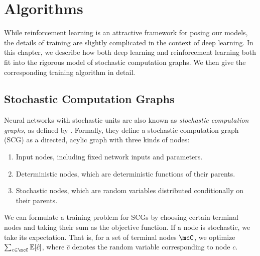 \documentclass[12pt]{report}
\begin{document}


\chapter{Algorithms}
\label{chap:algorithms}

While reinforcement learning is an attractive framework for posing our models, the details of training are slightly complicated in the context of deep learning.
In this chapter, we describe how both deep learning and reinforcement learning both fit into the rigorous model of stochastic computation graphs.
We then give the corresponding training algorithm in detail.

\section{Stochastic Computation Graphs}

Neural networks with stochastic units are also known as \emph{stochastic computation graphs}, as defined by \citet{schulman2015backprop}. Formally, they define a stochastic computation graph (SCG) as a directed, acylic graph with three kinds of nodes:
\begin{enumerate}
\item Input nodes, including fixed network inputs and parameters.
\item Deterministic nodes, which are deterministic functions of their parents.
\item Stochastic nodes, which are random variables distributed conditionally on their parents.
\end{enumerate}
We can formulate a training problem for SCGs by choosing certain terminal nodes and taking their sum as the objective function. If a node is stochastic, we take its expectation. That is, for a set of terminal nodes $\mcC$, we optimize $\sum_{c \in \mcC} \mathbb{E}[\hat{c}]$, where $\hat{c}$ denotes the random variable corresponding to node $c$.
\end{document}
